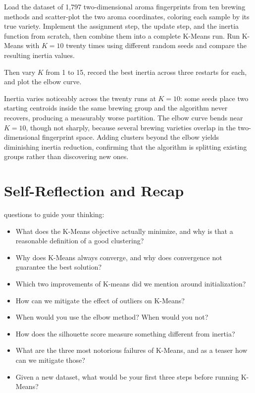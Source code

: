  Load the dataset of 1,797 two-dimensional aroma fingerprints 
from ten brewing methods and scatter-plot the two aroma coordinates, coloring each sample by its true variety.
Implement the assignment step, the update step, and the inertia function from scratch, 
then combine them into a complete K-Means run.
Run K-Means with $K{=}10$ twenty times using different random seeds and compare the resulting inertia values.


Then vary $K$ from 1 to 15, record the best inertia across three restarts for each, and plot the elbow curve.

 Inertia varies noticeably across the twenty runs at $K{=}10$: some seeds place two starting centroids inside the same brewing group and the algorithm never recovers, producing a measurably worse partition.
The elbow curve bends near $K{=}10$, though not sharply, because several brewing varieties overlap in the two-dimensional fingerprint space.
Adding clusters beyond the elbow yields diminishing inertia reduction, confirming that the algorithm is splitting existing groups rather than discovering new ones.






\section{Self-Reflection and Recap}

 questions to guide your thinking:
\begin{itemize}
    \item What does the K-Means objective actually minimize, and why is that a reasonable definition of a good clustering?
    \item Why does K-Means always converge, and why does convergence not guarantee the best solution?
    \item Which two improvements of K-means did we mention around initialization?
    \item How can we mitigate the effect of outliers on K-Means? 
    \item When would you use the elbow method? When would you not?
    \item How does the silhouette score measure something different from inertia?
    \item What are the three most notorious failures of K-Means, and as a teaser how can we mitigate those?
    \item Given a new dataset, what would be your first three steps before running K-Means?
\end{itemize}

